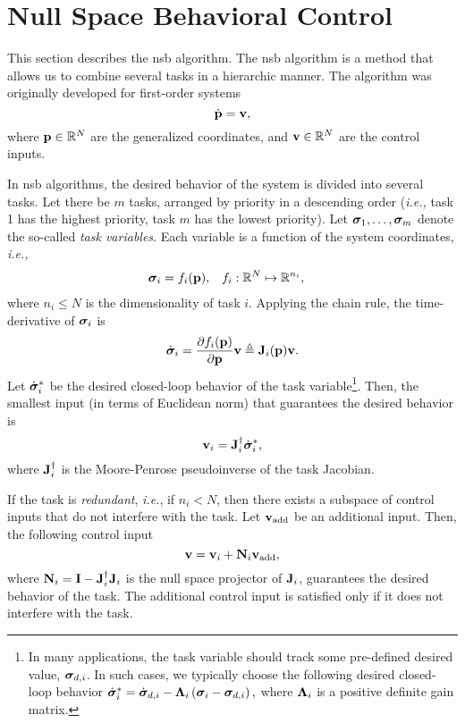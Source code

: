 \section{Null Space Behavioral Control}
\label{sec:background_NSB}

This section describes the \gls{nsb} algorithm.
The \gls{nsb} algorithm is a method that allows us to combine several tasks in a hierarchic manner.
The algorithm was originally developed for first-order systems
\begin{equation}
    \dot{\mathbf{p}} = \mathbf{v},
\end{equation}
where $\mathbf{p} \in \mathbb{R}^N$ are the generalized coordinates, and $\mathbf{v} \in \mathbb{R}^N$ are the control inputs.

In \gls{nsb} algorithms, the desired behavior of the system is divided into several tasks.
Let there be $m$ tasks, arranged by priority in a descending order (\emph{i.e.,} task 1 has the highest priority, task $m$ has the lowest priority).
Let $\bm{\sigma}_1, \ldots, \bm{\sigma}_m$ denote the so-called \emph{task variables}.
Each variable is a function of the system coordinates, \emph{i.e.,}
\begin{align}
    \bm{\sigma}_i &= f_i(\mathbf{p}), &
    f_i &: \mathbb{R}^N \mapsto \mathbb{R}^{n_i},
\end{align}
where $n_i \leq N$ is the dimensionality of task $i$.
Applying the chain rule, the time-derivative of $\bm{\sigma}_i$ is
\begin{equation}
    \dot{\bm{\sigma}}_i = \frac{\partial f_i(\mathbf{p})}{\partial \mathbf{p}} \mathbf{v} \triangleq \mathbf{J}_i(\mathbf{p}) \mathbf{v}.
\end{equation}
Let $\dot{\bm{\sigma}}_i^{*}$ be the desired closed-loop behavior of the task variable\footnote{
In many applications, the task variable should track some pre-defined desired value, $\bm{\sigma}_{d, i}$.
In such cases, we typically choose the following desired closed-loop behavior
$
    \dot{\bm{\sigma}}_i^{*} = \dot{\bm{\sigma}}_{d, i} - \bm{\Lambda}_i \left(\bm{\sigma}_i - \bm{\sigma}_{d,i}\right),    
$
where $\bm{\Lambda}_i$ is a positive definite gain matrix.
}.
Then, the smallest input (in terms of Euclidean norm) that guarantees the desired behavior is
\begin{equation}
    \mathbf{v}_i = \mathbf{J}_i^{\dagger} \dot{\bm{\sigma}}_i^{*},
\end{equation}
where $\mathbf{J}_i^{\dagger}$ is the Moore-Penrose pseudoinverse of the task Jacobian.

If the task is \emph{redundant}, \emph{i.e.}, if $n_i < N$, then there exists a subspace of control inputs that do not interfere with the task.
Let $\mathbf{v}_{\rm add}$ be an additional input.
Then, the following control input
\begin{equation}
    \mathbf{v} = \mathbf{v}_i + \mathbf{N}_i \mathbf{v}_{\rm add},
\end{equation}
where $\mathbf{N}_i = \mathbf{I} - \mathbf{J}_i^{\dagger}\mathbf{J}_i$ is the null space projector of $\mathbf{J}_i$, guarantees the desired behavior of the task.
The additional control input is satisfied only if it does not interfere with the task.

